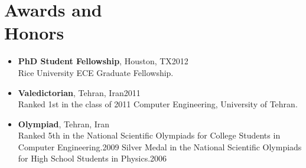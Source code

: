 \documentclass[overlapped]{res}
\begin{document}
\begin{resume}
\begin{itemize}
\end{itemize}

\section{Awards and\\ Honors}
\begin{itemize}
\item {\bf PhD Student Fellowship}, Houston, TX\hfill 2012\\
Rice University ECE Graduate Fellowship.
\item {\bf Valedictorian}, Tehran, Iran\hfill 2011\\
Ranked 1st in the class of 2011 Computer Engineering, University of Tehran.
\item {\bf Olympiad}, Tehran, Iran\\
Ranked 5th in the National Scientific Olympiads for College Students in Computer Engineering.\hfill 2009
Silver Medal in the National Scientific Olympiads for High School Students in Physics.\hfill 2006
\end{itemize}


\end{resume}
\end{document}
